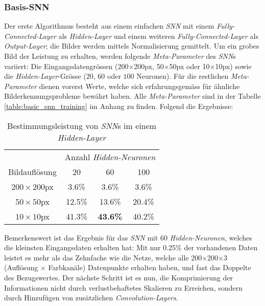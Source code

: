 \subsubsection{Basis-SNN}
Der erste Algorithmus besteht aus einem einfachen \textit{SNN} mit einem \textit{Fully-Connected-Layer} als \textit{Hidden-Layer} und einem weiteren \textit{Fully-Connected-Layer} als \textit{Output-Layer}; die Bilder werden mittels Normalisierung gemittelt.
Um ein grobes Bild der Leistung zu erhalten, werden folgende \textit{Meta-Parameter} des \textit{SNN}s variiert: Die Eingangsdatengrössen (200$\times$200px, 50$\times$50px oder 10$\times$10px) sowie die \textit{Hidden-Layer}-Grösse ($20$, $60$ oder $100$ Neuronen). Für die restlichen \textit{Meta-Parameter} dienen vorerst Werte, welche sich erfahrungsgemäss für ähnliche Bilderkennungsprobleme bewährt haben. Alle \textit{Meta-Parameter} sind in der Tabelle \ref{table:basic_snn_training} im Anhang zu finden. Folgend die Ergebnisse:

\begin{table}[h]
	\begin{center}
		\def\arraystretch{1.4}
		\begin{tabular}{c | c | c | c }
			& \multicolumn{3}{l}{Anzahl \textit{Hidden-Neuronen}} \\
			Bildauflösung & 20 & 60 & 100\\
			\hline
			$200\times200$px& 3.6\%& 3.6\% & 3.6\%\\
			$50\times50$px& 12.5\% & 13.6\% & 20.4\%\\
			$10\times10$px& 41.3\% & \textbf{43.6\%} & 40.2\%\\
		\end{tabular}
	\end{center}
\caption[Bestimmungsleistung von \textit{SNN}s]{Bestimmungsleistung von \textit{SNN}s im einem \textit{Hidden-Layer}}
\label{table:snn}
\end{table}

Bemerkenswert ist das Ergebnis für das \textit{SNN} mit 60 \textit{Hidden-Neuronen}, welches die kleinsten Eingangsdaten erhalten hat: Mit nur 0.25\% der vorhandenen Daten leistet es mehr als das Zehnfache wie die Netze, welche alle 200$\times$200$\times$3 (Auflösung $\times$ Farbkanäle) Datenpunkte erhalten haben, und fast das Doppelte des Bezugswertes. Der nächste Schritt ist es nun, die Komprimierung der Informationen nicht durch verlustbehaftetes Skalieren zu Erreichen, sondern durch Hinzufügen von zusätzlichen \textit{Convolution-Layers}.

